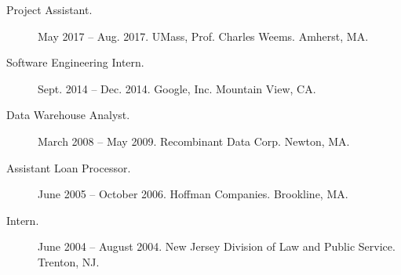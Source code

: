 \documentclass[10pt]{article}
\newcommand{\cvsec}[2]{
    \begin{tcolorbox}[width=\textwidth, breakable, title={#1}]
        #2
    \end{tcolorbox}
    \vspace{10pt}
}
\begin{document}
\cvsec{%
 Work Experience}{
\begin{description}
\item[Project Assistant.] May 2017 -- Aug. 2017. UMass, Prof. Charles Weems. Amherst, MA.
\item[Software Engineering Intern.] Sept. 2014 -- Dec. 2014. Google, Inc. Mountain View, CA.
\item[Data Warehouse Analyst.] March 2008 -- May 2009. Recombinant Data Corp. Newton, MA.
\item[Assistant Loan Processor.] June 2005 -- October 2006. Hoffman Companies. Brookline, MA.
\item[Intern.] June 2004 -- August 2004. New Jersey Division of Law and Public Service. Trenton, NJ.
\end{description}
}
\end{document}
